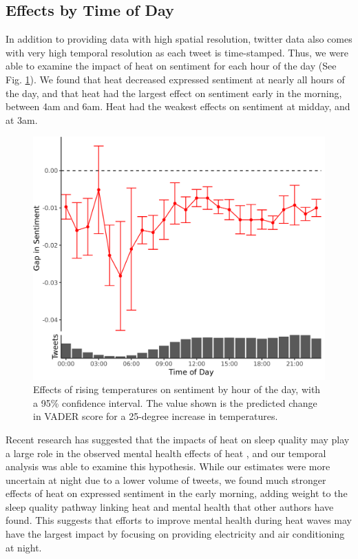\documentclass{article}
\begin{document}





\subsection{Effects by Time of Day}

In addition to providing data with high spatial resolution, twitter data also comes with very high temporal resolution as each tweet is time-stamped.  Thus, we were able to examine the impact of heat on sentiment for each hour of the day (See Fig. \ref{fig:ts-wbgt}).  We found that heat decreased expressed sentiment at nearly all hours of the day, and that heat had the largest effect on sentiment early in the morning, between 4am and 6am.  Heat had the weakest effects on sentiment at midday, and at 3am.

\begin{figure}[H]
  \centering
  \includegraphics[width=0.5\linewidth]{../res/ts.png}
  \caption{Effects of rising temperatures on sentiment by hour of the day, with a 95\% confidence interval.  The value shown is the predicted change in VADER score for a 25-degree increase in temperatures.}
  \label{fig:ts-wbgt}
\end{figure}

Recent research has suggested that the impacts of heat on sleep quality may play a large role in the observed mental health effects of heat \cite{Obradovich2017May, Mullins2019Dec}, and our temporal analysis was able to examine this hypothesis.  While our estimates were more uncertain at night due to a lower volume of tweets, we found much stronger effects of heat on expressed sentiment in the early morning, adding weight to the sleep quality pathway linking heat and mental health that other authors have found.  This suggests that efforts to improve mental health during heat waves may have the largest impact by focusing on providing electricity and air conditioning at night.
\end{document}
